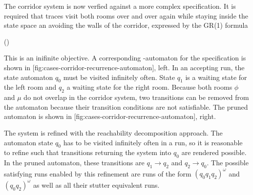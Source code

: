 \startsubsection[title={2-Recurrence and Safety},reference=sec:cases-corridor-recurrence]


    The corridor system is now verfied against a more complex specification.
    It is required that traces visit both rooms over and over again while staying inside the state space an avoiding the walls of the corridor, expressed by the GR(1) formula

    \startformula
        \Globally (\neg \theta \wedge \Finally \phi \wedge \Finally \mu ) \EndPeriod
    \stopformula

    This is an inifinite objective.
    A corresponding \omega-automaton for the specification is shown in [fig:cases-corridor-recurrence-automaton], left.
    In an accepting run, the state automaton $q_0$ must be visited infinitely often.
    State $q_1$ is a waiting state for the left room and $q_2$ a waiting state for the right room.
    Because both rooms $\phi$ and $\mu$ do not overlap in the corridor system, two transitions can be removed from the automaton because their transition conditions are not satisfiable.
    The pruned automaton is shown in [fig:cases-corridor-recurrence-automaton], right.

    The system is refined with the reachability decomposition approach.
    The automaton state $q_0$ has to be visited infinitely often in a run, so it is reasonable to refine such that transitions returning the system into $q_0$ are rendered possible.
    In the pruned automaton, these transitions are $q_1 \rightarrow q_2$ and $q_2 \rightarrow q_0$.
    The possible satisfying runs enabled by this refinement are runs of the form $(q_0 q_1 q_2)^\omega$ and $(q_0 q_2)^\omega$ as well as all their stutter equivalent runs.


